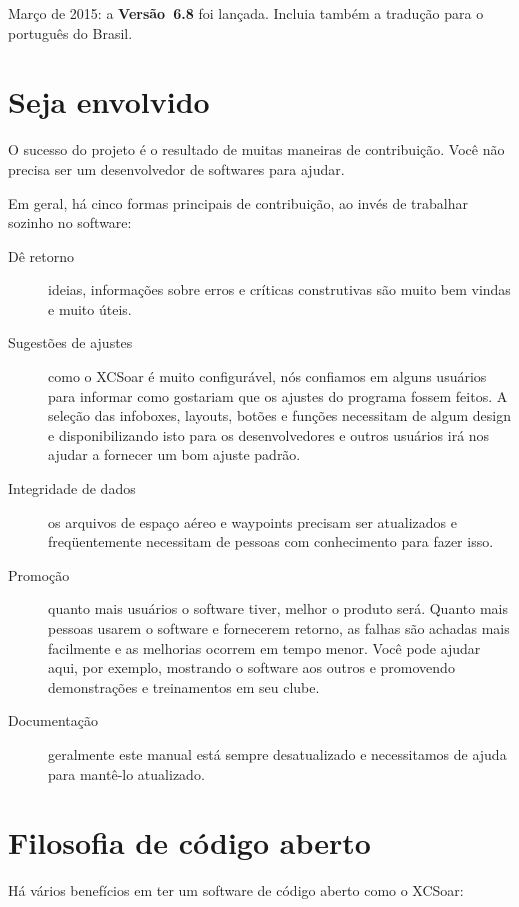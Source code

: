 Março de 2015: a {\bf Versão~6.8} foi lançada.  Incluia também a tradução para o português do Brasil.


\section{Seja envolvido}

O sucesso do projeto é o resultado de muitas maneiras de contribuição. Você não precisa ser um desenvolvedor de softwares para ajudar.

Em geral, há cinco formas principais de contribuição, ao invés de trabalhar sozinho no software:

\begin{description}
\item[Dê retorno]
ideias, informações sobre erros e críticas construtivas são muito bem vindas e muito úteis.
\item[Sugestões de ajustes]
como o XCSoar é muito configurável, nós confiamos em alguns usuários para informar como gostariam que os ajustes do programa fossem feitos.  A seleção das infoboxes, layouts, botões e funções necessitam de algum design e disponibilizando isto para os desenvolvedores e outros usuários irá nos ajudar a fornecer um bom ajuste padrão.
\item[Integridade de dados]
os arquivos de espaço aéreo e waypoints precisam ser atualizados e freqüentemente necessitam de pessoas com conhecimento para fazer isso.
\item[Promoção]  quanto mais usuários o software tiver, melhor o produto será.  Quanto mais pessoas usarem o software e fornecerem retorno, as falhas são achadas mais facilmente e as melhorias ocorrem em tempo menor.  Você pode ajudar aqui, por exemplo, mostrando o software aos outros e promovendo demonstrações e treinamentos em seu clube.
\item[Documentação]  geralmente este manual está sempre desatualizado e necessitamos de ajuda para mantê-lo atualizado.
\end{description}


\section{Filosofia de código aberto}

Há vários benefícios em ter um software de código aberto como o XCSoar:

